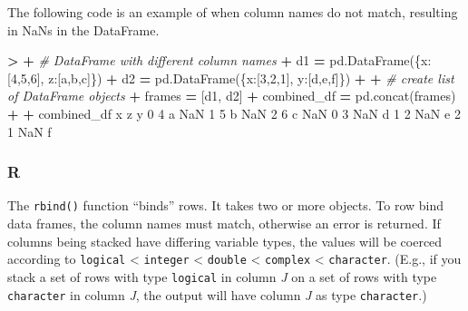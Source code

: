 \documentclass[
]{book}
\newenvironment{Shaded}{\begin{snugshade}}{\end{snugshade}}
\newcommand{\CommentTok}[1]{\textcolor[rgb]{0.56,0.35,0.01}{\textit{#1}}}
\newcommand{\DecValTok}[1]{\textcolor[rgb]{0.00,0.00,0.81}{#1}}
\newcommand{\NormalTok}[1]{#1}
\newcommand{\OperatorTok}[1]{\textcolor[rgb]{0.81,0.36,0.00}{\textbf{#1}}}
\newcommand{\StringTok}[1]{\textcolor[rgb]{0.31,0.60,0.02}{#1}}
\begin{document}
The following code is an example of when column names do not match, resulting in NaNs in the DataFrame.

\begin{Shaded}
\begin{Highlighting}[]
\OperatorTok{\textgreater{}} 
\OperatorTok{+} \CommentTok{\# DataFrame with different column names}
\OperatorTok{+}\NormalTok{ d1 }\OperatorTok{=}\NormalTok{ pd.DataFrame(\{}\StringTok{\textquotesingle{}x\textquotesingle{}}\NormalTok{:[}\DecValTok{4}\NormalTok{,}\DecValTok{5}\NormalTok{,}\DecValTok{6}\NormalTok{], }\StringTok{\textquotesingle{}z\textquotesingle{}}\NormalTok{:[}\StringTok{\textquotesingle{}a\textquotesingle{}}\NormalTok{,}\StringTok{\textquotesingle{}b\textquotesingle{}}\NormalTok{,}\StringTok{\textquotesingle{}c\textquotesingle{}}\NormalTok{]\})}
\OperatorTok{+}\NormalTok{ d2 }\OperatorTok{=}\NormalTok{ pd.DataFrame(\{}\StringTok{\textquotesingle{}x\textquotesingle{}}\NormalTok{:[}\DecValTok{3}\NormalTok{,}\DecValTok{2}\NormalTok{,}\DecValTok{1}\NormalTok{], }\StringTok{\textquotesingle{}y\textquotesingle{}}\NormalTok{:[}\StringTok{\textquotesingle{}d\textquotesingle{}}\NormalTok{,}\StringTok{\textquotesingle{}e\textquotesingle{}}\NormalTok{,}\StringTok{\textquotesingle{}f\textquotesingle{}}\NormalTok{]\})}
\OperatorTok{+} 
\OperatorTok{+} \CommentTok{\# create list of DataFrame objects}
\OperatorTok{+}\NormalTok{ frames }\OperatorTok{=}\NormalTok{ [d1, d2]}
\OperatorTok{+}\NormalTok{ combined\_df }\OperatorTok{=}\NormalTok{ pd.concat(frames)}
\OperatorTok{+} 
\OperatorTok{+}\NormalTok{ combined\_df}
\NormalTok{   x    z    y}
\DecValTok{0}  \DecValTok{4}\NormalTok{    a  NaN}
\DecValTok{1}  \DecValTok{5}\NormalTok{    b  NaN}
\DecValTok{2}  \DecValTok{6}\NormalTok{    c  NaN}
\DecValTok{0}  \DecValTok{3}\NormalTok{  NaN    d}
\DecValTok{1}  \DecValTok{2}\NormalTok{  NaN    e}
\DecValTok{2}  \DecValTok{1}\NormalTok{  NaN    f}
\end{Highlighting}
\end{Shaded}

\hypertarget{r-30}{%
\subsubsection*{R}\label{r-30}}

The \texttt{rbind()} function ``binds'' rows. It takes two or more objects. To row bind data frames, the column names must match, otherwise an error is returned. If columns being stacked have differing variable types, the values will be coerced according to \texttt{logical} \textless{} \texttt{integer} \textless{} \texttt{double} \textless{} \texttt{complex} \textless{} \texttt{character}. (E.g., if you stack a set of rows with type \texttt{logical} in column \emph{J} on a set of rows with type \texttt{character} in column \emph{J}, the output will have column \emph{J} as type \texttt{character}.)
\end{document}
